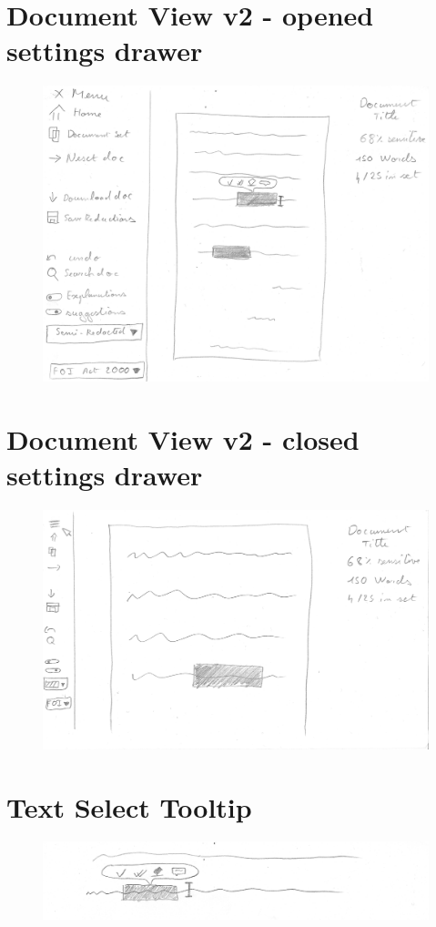 \documentclass{l4proj}
\begin{document}
\begin{appendices}
    \section{Document View v2 - opened settings drawer}
    \begin{figure}[H]
        \centering
        \includegraphics[width=\linewidth]{images/wireframes/doc_view.jpg}
    \end{figure}
    \section{Document View v2 - closed settings drawer}
    \begin{figure}[H]
        \centering
        \includegraphics[width=\linewidth]{images/wireframes/doc-view.jpg}
    \end{figure}
    \section{Text Select Tooltip}
    \begin{figure}[H]
        \centering
        \includegraphics[width=\linewidth]{images/wireframes/tooltip.jpg}
    \end{figure}

\end{appendices}
\end{document}
